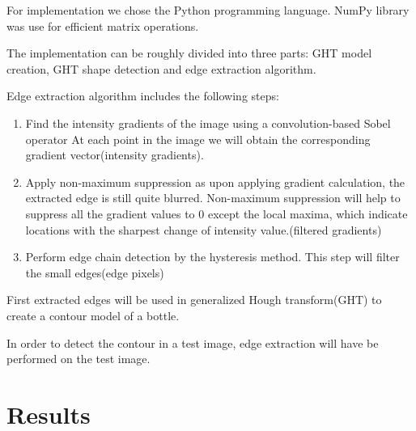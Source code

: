 \documentclass[letterpaper,12pt]{article}
\begin{document}
For implementation we chose the Python programming language. NumPy library was use for efficient matrix operations.

The implementation can be roughly divided into three parts: GHT model creation, GHT shape detection and edge extraction algorithm.

Edge extraction algorithm includes the following steps:

\begin{enumerate}
    \item Find the intensity gradients of the image using a convolution-based Sobel operator At each point in the image we will obtain the corresponding gradient vector(intensity gradients).

    \item Apply non-maximum suppression as upon applying gradient calculation, the extracted edge is still quite blurred. Non-maximum suppression will help to suppress all the gradient values to 0 except the local maxima, which indicate locations with the sharpest change of intensity value.(filtered gradients)
	\item Perform edge chain detection by the hysteresis method. This step will filter the small edges(edge pixels) 
\end{enumerate}

First extracted edges will be used in generalized Hough transform(GHT) to create a contour model of a bottle.


In order to detect the contour in a test image, edge extraction will have be performed on the test image. 


\section{Results}
\end{document}
